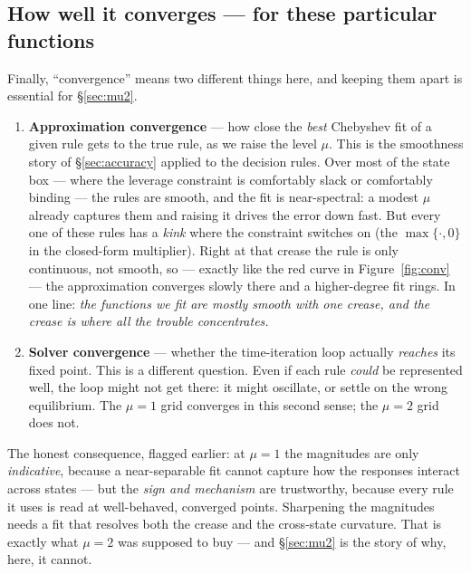 \documentclass[11pt]{article}
\begin{document}
\subsection{How well it converges --- for these particular functions}
\label{sec:connect-conv}

Finally, ``convergence'' means two different things here, and keeping them
apart is essential for \S\ref{sec:mu2}.

\begin{enumerate}
\item \textbf{Approximation convergence} --- how close the \emph{best}
      Chebyshev fit of a given rule gets to the true rule, as we raise the
      level $\mu$. This is the smoothness story of \S\ref{sec:accuracy}
      applied to the decision rules. Over most of the state box --- where the
      leverage constraint is comfortably slack or comfortably binding --- the
      rules are smooth, and the fit is near-spectral: a modest $\mu$ already
      captures them and raising it drives the error down fast. But every one
      of these rules has a \emph{kink} where the constraint switches on (the
      $\max\{\cdot,0\}$ in the closed-form multiplier). Right at that crease
      the rule is only continuous, not smooth, so --- exactly like the red
      curve in Figure~\ref{fig:conv} --- the approximation converges slowly
      there and a higher-degree fit rings. In one line: \emph{the functions
      we fit are mostly smooth with one crease, and the crease is where all
      the trouble concentrates.}
\item \textbf{Solver convergence} --- whether the time-iteration loop
      actually \emph{reaches} its fixed point. This is a different question.
      Even if each rule \emph{could} be represented well, the loop might not
      get there: it might oscillate, or settle on the wrong equilibrium. The
      $\mu=1$ grid converges in this second sense; the $\mu=2$ grid does not.
\end{enumerate}

\noindent The honest consequence, flagged earlier: at $\mu=1$ the magnitudes
are only \emph{indicative}, because a near-separable fit cannot capture how
the responses interact across states --- but the \emph{sign and mechanism}
are trustworthy, because every rule it uses is read at well-behaved,
converged points. Sharpening the magnitudes needs a fit that resolves both
the crease and the cross-state curvature. That is exactly what $\mu=2$ was
supposed to buy --- and \S\ref{sec:mu2} is the story of why, here, it cannot.
\end{document}
